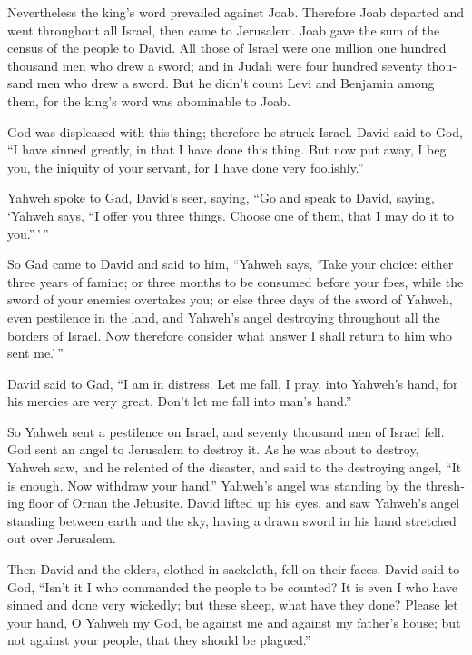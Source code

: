 \begin{paracol}{2}
\begin{otherlanguage}{english}
 Nevertheless the king's word prevailed against Joab.
Therefore Joab departed and went throughout all Israel, then came to
Jerusalem.  Joab gave the sum of the census of the people
to David. All those of Israel were one million one hundred thousand men
who drew a sword; and in Judah were four hundred seventy thousand men
who drew a sword.  But he didn't count Levi and Benjamin
among them, for the king's word was abominable to Joab.

 God was displeased with this thing; therefore he struck
Israel.  David said to God, ``I have sinned greatly, in
that I have done this thing. But now put away, I beg you, the iniquity
of your servant, for I have done very foolishly.''

 Yahweh spoke to Gad, David's seer, saying,
 ``Go and speak to David, saying, `Yahweh says, ``I offer
you three things. Choose one of them, that I may do it to you.''\,'\,''

 So Gad came to David and said to him, ``Yahweh says,
`Take your choice:  either three years of famine; or
three months to be consumed before your foes, while the sword of your
enemies overtakes you; or else three days of the sword of Yahweh, even
pestilence in the land, and Yahweh's angel destroying throughout all the
borders of Israel. Now therefore consider what answer I shall return to
him who sent me.'\,''

 David said to Gad, ``I am in distress. Let me fall, I
pray, into Yahweh's hand, for his mercies are very great. Don't let me
fall into man's hand.''

 So Yahweh sent a pestilence on Israel, and seventy
thousand men of Israel fell.  God sent an angel to
Jerusalem to destroy it. As he was about to destroy, Yahweh saw, and he
relented of the disaster, and said to the destroying angel, ``It is
enough. Now withdraw your hand.'' Yahweh's angel was standing by the
threshing floor of Ornan the Jebusite.  David lifted up
his eyes, and saw Yahweh's angel standing between earth and the sky,
having a drawn sword in his hand stretched out over Jerusalem.

Then David and the elders, clothed in sackcloth, fell on their faces.
 David said to God, ``Isn't it I who commanded the people
to be counted? It is even I who have sinned and done very wickedly; but
these sheep, what have they done? Please let your hand, O Yahweh my God,
be against me and against my father's house; but not against your
people, that they should be plagued.''


\end{otherlanguage}
\end{paracol}
